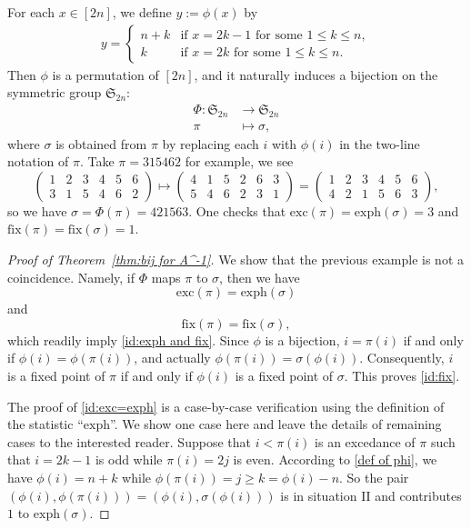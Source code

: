\documentclass[11pt,reqno]{amsart}
\numberwithin{equation}{section}
\theoremstyle{plain}
\theoremstyle{definition}
\renewcommand{\S}{\mathfrak{S}}
\def\exc{\mathrm{exc}}
\def\fix{\mathrm{fix}}
\def\exph{\mathrm{exph}}
\begin{document}
 For each $x\in [2n]$, we define $y:=\phi(x)$ by
\begin{align}\label{def of phi}
y=\begin{cases}
n+k & \text{if $x=2k-1$ for some $1\le k\le n$},\\
k & \text{if $x=2k$ for some $1\le k\le n$}.
\end{cases}
\end{align}
Then $\phi$ is a permutation of $[2n]$, and it naturally induces a bijection on the symmetric group $\S_{2n}$:
\begin{align*}
\Phi: \S_{2n}&\to\S_{2n}\\
\pi &\mapsto \sigma,
\end{align*}
where $\sigma$ is obtained from $\pi$ by replacing each $i$ with $\phi(i)$ in the two-line notation of $\pi$. Take $\pi=315462$ for example, we see
$$\begin{pmatrix}
1 & 2 & 3 & 4 & 5 & 6 \\
3 & 1 & 5 & 4 & 6 & 2
\end{pmatrix}\mapsto
\begin{pmatrix}
4 & 1 & 5 & 2 & 6 & 3 \\
5 & 4 & 6 & 2 & 3 & 1
\end{pmatrix}=
\begin{pmatrix}
1 & 2 & 3 & 4 & 5 & 6 \\
4 & 2 & 1 & 5 & 6 & 3
\end{pmatrix},$$
so we have $\sigma=\Phi(\pi)=421563$. One checks that $\exc(\pi)=\exph(\sigma)=3$ and $\fix(\pi)=\fix(\sigma)=1$.

\begin{proof}[Proof of Theorem~\ref{thm:bij for A^-1}]
We show that the previous example is not a coincidence. Namely, if $\Phi$ maps $\pi$ to $\sigma$, then we have
\begin{equation}
\label{id:exc=exph}
\exc(\pi) =\exph(\sigma)
\end{equation}
and
\begin{equation}
\label{id:fix}
\fix(\pi) =\fix(\sigma),
\end{equation}
which readily imply \eqref{id:exph and fix}.
Since $\phi$ is a bijection, $i=\pi(i)$ if and only if $\phi(i)=\phi(\pi(i))$, and actually $\phi(\pi(i))=\sigma(\phi(i))$. Consequently, $i$ is a fixed point of $\pi$ if and only if $\phi(i)$ is a fixed point of $\sigma$. This proves \eqref{id:fix}.

The proof of \eqref{id:exc=exph} is a case-by-case verification using the definition of the statistic ``$\exph$''. We show one case here and leave the details of remaining cases to the interested reader. Suppose that $i<\pi(i)$ is an excedance of $\pi$ such that $i=2k-1$ is odd while $\pi(i)=2j$ is even. According to \eqref{def of phi}, we have $\phi(i)=n+k$ while $\phi(\pi(i))=j\ge k=\phi(i)-n$. So the pair $(\phi(i),\phi(\pi(i)))=(\phi(i),\sigma(\phi(i)))$ is in situation II and contributes $1$ to $\exph(\sigma)$.
\end{proof}
\end{document}
